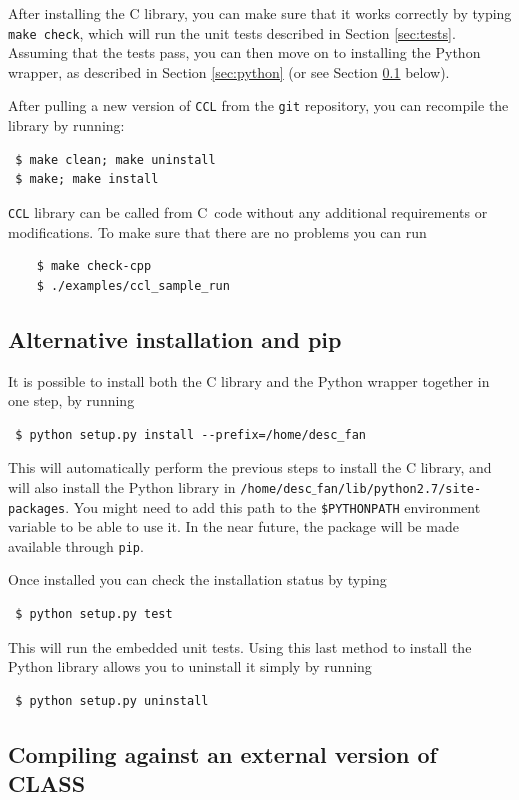 \documentclass[\docopts]{\docclass}
\newcommand{\ccl}{{\tt CCL}\xspace}
\newcommand{\CC}{C\nolinebreak\hspace{-.05em}\raisebox{.3ex}{\footnotesize +}\nolinebreak\hspace{-.10em}\raisebox{.3ex}{\footnotesize +}}
\begin{document}
After installing the C library, you can make sure that it works correctly by typing {\tt make check}, which will run the unit tests described in Section \ref{sec:tests}. Assuming that the tests pass, you can then move on to installing the Python wrapper, as described in Section \ref{sec:python} (or see Section \ref{sec:install:alternative} below).

After pulling a new version of \ccl from the {\tt git} repository, you can recompile the library by running:
\begin{verbatim}
 $ make clean; make uninstall
 $ make; make install
\end{verbatim}
\ccl library can be called from \CC\ code without any  additional requirements or modifications. To make sure that there are no problems you can run
\begin{verbatim}
    $ make check-cpp
    $ ./examples/ccl_sample_run
   \end{verbatim}

\subsection{Alternative installation and pip}
\label{sec:install:alternative}

It is possible to install both the C library and the Python wrapper together in one step, by running
\begin{verbatim}
 $ python setup.py install --prefix=/home/desc_fan
\end{verbatim}
This will automatically perform the previous steps to install the C library, and will also install the Python library in {\tt /home/desc$\_$fan/lib/python2.7/site-packages}. You might need to add this path to the {\tt \$PYTHONPATH} environment variable to be able to use it. In the near future, the package will be made available through {\tt pip}.

Once installed you can check the installation status by typing
\begin{verbatim}
 $ python setup.py test
\end{verbatim}

This will run the embedded unit tests. Using this last method to install the Python library allows you to uninstall it simply by running
\begin{verbatim}
 $ python setup.py uninstall
\end{verbatim}

\subsection{Compiling against an external version of CLASS}
\label{sec:extclass}
\end{document}
